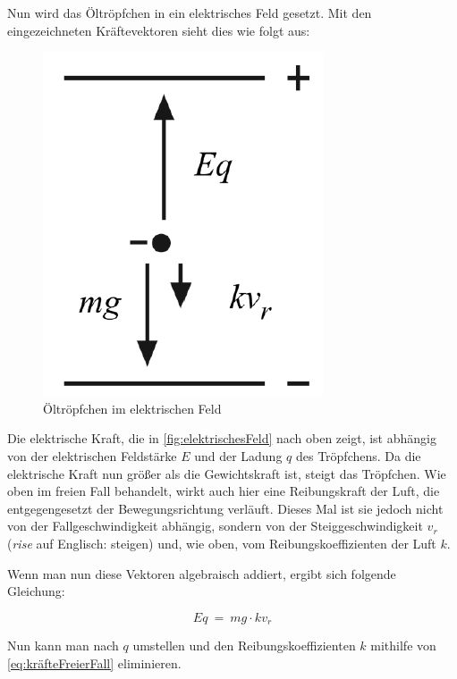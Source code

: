 \noindent Nun wird das Öltröpfchen in ein elektrisches Feld gesetzt. Mit den eingezeichneten Kräftevektoren sieht dies wie folgt aus:

\begin{figure}[h]
	\begin{center}
		\includegraphics[scale=0.5]{bilder/pdf/Abbildung2_elektrischesFeld.pdf}
		\caption{Öltröpfchen im elektrischen Feld \parencite[1]{instructionManualHalogen}}
		\label{fig:elektrischesFeld}
	\end{center}
\end{figure}

\noindent Die elektrische Kraft, die in \autoref{fig:elektrischesFeld} nach oben zeigt, ist abhängig von der elektrischen Feldstärke $E$ und der Ladung $q$ des Tröpfchens. Da die elektrische Kraft nun größer als die Gewichtskraft ist, steigt das Tröpfchen. Wie oben im freien Fall behandelt, wirkt auch hier eine Reibungskraft der Luft, die entgegengesetzt der Bewegungsrichtung verläuft. Dieses Mal ist sie jedoch nicht von der Fallgeschwindigkeit abhängig, sondern von der Steiggeschwindigkeit $v_r$ (\textit{rise} auf Englisch: steigen) und, wie oben, vom Reibungskoeffizienten der Luft $k$.

Wenn man nun diese Vektoren algebraisch addiert, ergibt sich folgende Gleichung:

\begin{equation}\label{eq:elektrischesFeld}
	Eq \ = \ mg \cdot kv_r
\end{equation}

\noindent Nun kann man nach $q$ umstellen und den Reibungskoeffizienten $k$ mithilfe von \autoref{eq:kräfteFreierFall} eliminieren. 

